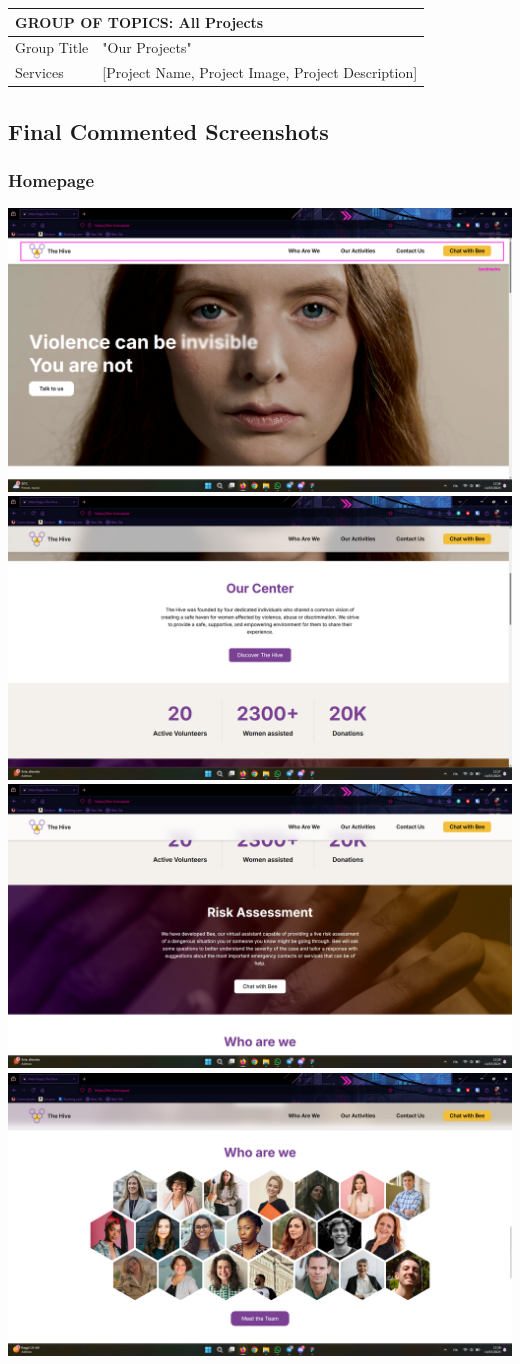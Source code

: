 \begin{tabular}{ |p{5cm}|p{6cm}| }
    \hline
    \multicolumn{2}{|l|}{\textbf{GROUP OF TOPICS: All Projects}} \\
    \hline
    Group Title & "Our Projects" \\
    \hline
    Services & [Project Name, Project Image, Project Description] \\
    \hline
\end{tabular}

\pagebreak
\subsection{Final Commented Screenshots}

\subsubsection{Homepage}
\includegraphics[width=0.5\linewidth]{img/design-document/website-screenshots/homepage-1.png}
\includegraphics[width=0.5\linewidth]{img/design-document/website-screenshots/homepage-2.png}
\includegraphics[width=0.5\linewidth]{img/design-document/website-screenshots/homepage-3.png}
\includegraphics[width=0.5\linewidth]{img/design-document/website-screenshots/homepage-4.png}
